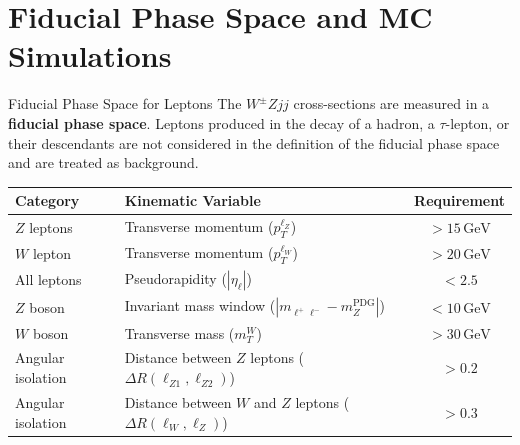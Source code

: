 \section{Fiducial Phase Space and MC Simulations}

\begin{frame}{Fiducial Phase Space for Leptons}
    The $W^\pm Zjj$ cross-sections are measured in a \textbf{fiducial phase space}. Leptons produced in the decay of a hadron, a $\tau$-lepton, or their descendants are not considered in the definition of the fiducial phase space and are treated as background.
    
    \vspace{0.4cm} %
    
    \begin{center}
    \small %
    \renewcommand{\arraystretch}{1.3} %
    \begin{tabular}{llc}
    \hline
    \textbf{Category} & \textbf{Kinematic Variable} & \textbf{Requirement} \\
    \hline
    $Z$ leptons & Transverse momentum ($p_T^{\ell_Z}$) & $> 15\,\text{GeV}$ \\
    $W$ lepton & Transverse momentum ($p_T^{\ell_W}$) & $> 20\,\text{GeV}$ \\
    All leptons & Pseudorapidity ($|\eta_\ell|$) & $< 2.5$ \\
    $Z$ boson & Invariant mass window ($|m_{\ell^+ \ell^-} - m_Z^{\text{PDG}}|$) & $< 10\,\text{GeV}$ \\
    $W$ boson & Transverse mass ($m_T^W$) & $> 30\,\text{GeV}$ \\
    Angular isolation & Distance between $Z$ leptons ($\Delta R(\ell_{Z1}, \ell_{Z2})$) & $> 0.2$ \\
    Angular isolation & Distance between $W$ and $Z$ leptons ($\Delta R(\ell_W, \ell_Z)$) & $> 0.3$ \\
    \hline
    \end{tabular}
    \end{center}
\end{frame}

